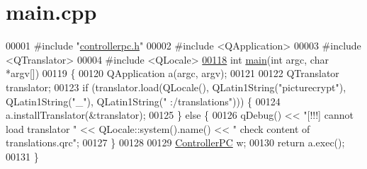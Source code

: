 \hypertarget{main_8cpp_source}{}\section{main.\+cpp}

\begin{DoxyCode}
00001 \textcolor{preprocessor}{#include "\hyperlink{controllerpc_8h}{controllerpc.h}"}
00002 \textcolor{preprocessor}{#include <QApplication>}
00003 \textcolor{preprocessor}{#include <QTranslator>}
00004 \textcolor{preprocessor}{#include <QLocale>}
\hypertarget{main_8cpp_source.tex_l00118}{}\hyperlink{main_8cpp_a0ddf1224851353fc92bfbff6f499fa97}{00118} \textcolor{keywordtype}{int} \hyperlink{main_8cpp_a0ddf1224851353fc92bfbff6f499fa97}{main}(\textcolor{keywordtype}{int} argc, \textcolor{keywordtype}{char} *argv[])
00119 \{
00120     QApplication a(argc, argv);
00121 
00122     QTranslator translator;
00123     \textcolor{keywordflow}{if} (translator.load(QLocale(), QLatin1String(\textcolor{stringliteral}{"picturecrypt"}), QLatin1String(\textcolor{stringliteral}{"\_"}), QLatin1String(\textcolor{stringliteral}{"
      :/translations"}))) \{
00124         a.installTranslator(&translator);
00125     \} \textcolor{keywordflow}{else} \{
00126         qDebug() << \textcolor{stringliteral}{"[!!!] cannot load translator "} << QLocale::system().name() << \textcolor{stringliteral}{" check content of
       translations.qrc"};
00127     \}
00128 
00129     \hyperlink{class_controller_p_c}{ControllerPC} w;
00130     \textcolor{keywordflow}{return} a.exec();
00131 \}
\end{DoxyCode}
